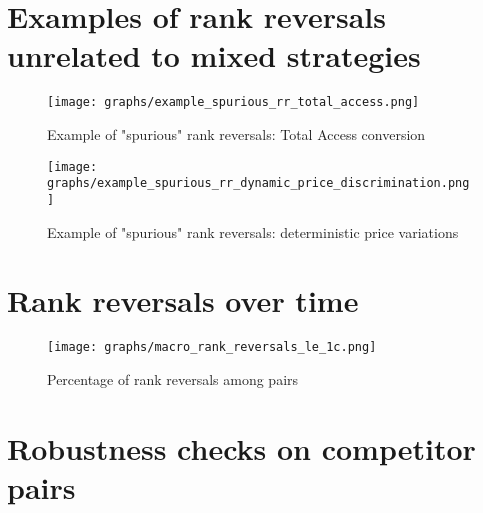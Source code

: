 \documentclass[english]{article}
\begin{document}
\newpage



\newpage

\appendix

\newpage

\section{Examples of rank reversals unrelated to mixed strategies}

\begin{figure}[htb!]
    \caption{Example of "spurious" rank reversals: Total Access conversion}
	\centering
		\texttt{[image: graphs/example\_spurious\_rr\_total\_access.png]}
\label{fig:rr_total_access}
\end{figure}

\begin{figure}[htb!]
    \caption{Example of "spurious" rank reversals: deterministic price variations}
	\centering
\texttt{[image: graphs/example\_spurious\_rr\_dynamic\_price\_discrimination.png]}
\label{fig:rr_dynamic_price_discrimination}
\end{figure}

\section{Rank reversals over time}

\begin{figure}[htb!]
    \caption{Percentage of rank reversals among pairs}
    \label{fig:pct_reversed_pairs}
	\centering
		\texttt{[image: graphs/macro\_rank\_reversals\_le\_1c.png]}
\end{figure}

\section{Robustness checks on competitor pairs}
\end{document}

